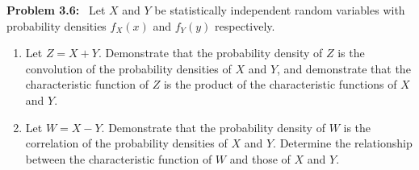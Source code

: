 \documentclass[11pt]{article}
\newenvironment{problem}[1]
{\par\bigskip\noindent\textbf{Problem #1:}\ }
{\par}
\begin{document}
    \begin{problem}{3.6}
Let $X$ and $Y$ be statistically independent random variables with probability
densities $f_X(x)$ and $f_Y(y)$ respectively.
\begin{enumerate}[label=(\alph*)]
  \item Let $Z = X + Y$. Demonstrate that the probability density of $Z$ is the
  convolution of the probability densities of $X$ and $Y$, and demonstrate
  that the characteristic function of $Z$ is the product of the
  characteristic functions of $X$ and $Y$.
  \item Let $W = X - Y$. Demonstrate that the probability density of $W$ is the
  correlation of the probability densities of $X$ and $Y$. Determine the
  relationship between the characteristic function of $W$ and those of
  $X$ and $Y$.
\end{enumerate}
    \end{problem}
\end{document}
